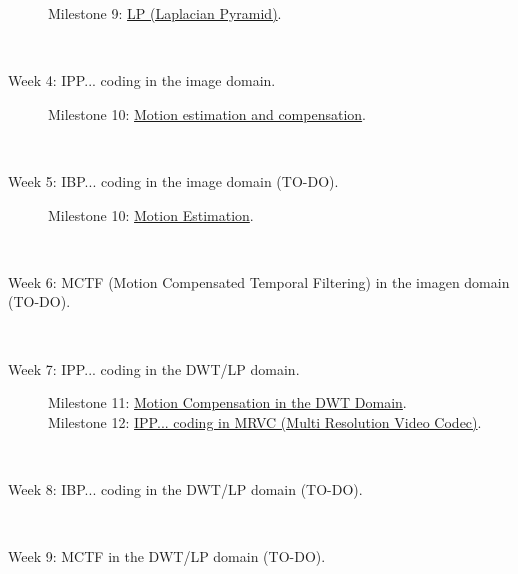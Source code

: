 \begin{description}
\begin{description}
  \item [Milestone 9: {\normalfont \href{}{LP (Laplacian Pyramid)}.}]
  \end{description}
  ~\newline
\item [Week 4: {\normalfont IPP... coding in the image domain.}]
  \begin{description}
  \item [Milestone 10: {\normalfont \href{https://sistemas-multimedia.github.io/milestones/10-ME/}{Motion estimation and compensation}.}]
  \end{description}
  ~\newline
\item [Week 5: {\normalfont IBP... coding in the image domain (TO-DO).}]
  \begin{description}
  \item [Milestone 10: {\normalfont \href{https://sistemas-multimedia.github.io/milestones/10-ME/}{Motion Estimation}.}] %
  \end{description}
  ~\newline
\item [Week 6: {\normalfont MCTF (Motion Compensated Temporal Filtering) in the imagen domain (TO-DO).}]
  ~\newline
\item [Week 7: {\normalfont IPP... coding in the DWT/LP domain.}]
  \begin{description}
  \item [Milestone 11: {\normalfont \href{https://sistemas-multimedia.github.io/milestones/11-MC_in_DWT_domain/}{Motion Compensation in the DWT Domain}.}]
  \item [Milestone 12: {\normalfont \href{https://sistemas-multimedia.github.io/milestones/12-IPP_coding/}{IPP... coding in MRVC (Multi Resolution Video Codec)}.}]
  \end{description}
  ~\newline
\item [Week 8: {\normalfont IBP... coding in the DWT/LP domain (TO-DO).}]
  ~\newline
\item [Week 9: {\normalfont MCTF in the DWT/LP domain (TO-DO).}]
\end{description}

